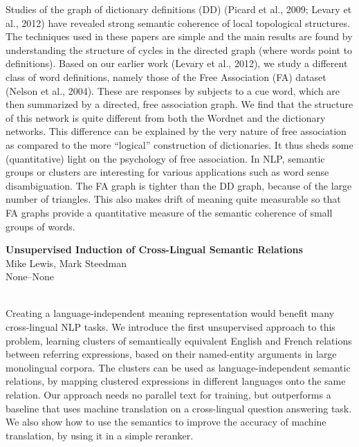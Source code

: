 \documentclass[twoside,makeidx]{book}
\renewcommand{\normalsize}{\fontsize{8}{9}\selectfont}
\renewcommand{\small}{\fontsize{7}{8}\selectfont}
\begin{document}
{\small Studies of the graph of dictionary definitions (DD) (Picard et al., 2009; Levary et al., 2012) have revealed strong semantic coherence of local topological structures. The techniques used in these papers are simple and the main results are found by understanding the structure of cycles in the directed graph (where words point to definitions). Based on our earlier work (Levary et al., 2012), we study a different class of word definitions, namely those of the Free Association (FA) dataset (Nelson et al., 2004). These are responses by subjects to a cue word, which are then summarized by a directed, free association graph.   We find that the structure of this network is quite different from both the Wordnet and the dictionary networks. This difference can be explained by the very nature of free association as compared to the more ``logical'' construction of dictionaries. It thus sheds some (quantitative) light on the psychology of free association.  In NLP, semantic groups or clusters are interesting for various applications such as word sense disambiguation. The FA graph is tighter than the DD graph, because of the large number of triangles. This also makes drift of meaning quite measurable so that FA graphs provide a quantitative measure of the semantic coherence of small groups of words.}
\par\vspace{2em}\noindent%
\begin{minipage}{\linewidth}%
\begin{center}
\textbf{\normalsize Unsupervised Induction of Cross-Lingual Semantic Relations}\\
\normalsize  Mike Lewis,  Mark Steedman\\
{\small None--None}\\
\end{center}
\end{minipage}\\[0.5em]
\nopagebreak%
\noindent%
{\small Creating a language-independent meaning representation would benefit many cross-lingual NLP tasks. We introduce the first unsupervised approach to this problem, learning clusters of semantically equivalent English and French relations between referring expressions, based on their named-entity arguments in large monolingual corpora. The clusters can be used as language-independent semantic relations, by mapping clustered expressions in different languages onto the same relation. Our approach needs no parallel text for training, but outperforms a baseline that uses machine translation on a cross-lingual question answering task. We also show how to use the semantics to improve the accuracy of machine translation, by using it in a simple reranker.}
\end{document}
